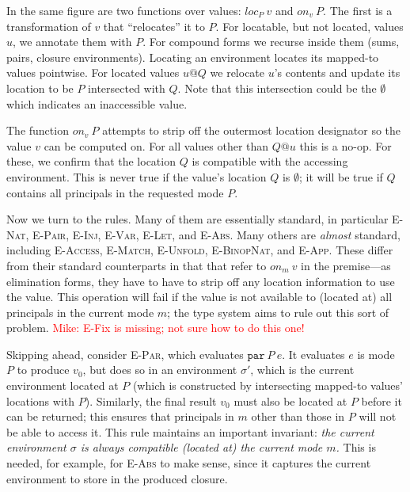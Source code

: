 \documentclass[10pt]{article}
\makeatletter
\newcommand{\rulelab}[1]{{\small \textsc{#1}}}
\newcommand{\kw}[1]{\ensuremath{\mathtt{#1}}}
\newcommand{\epar}[2]{\ensuremath{\kw{par}~{#1}~{#2}}}
\newcommand{\vloc}[2]{\ensuremath{{#1}\kw{@}{#2}}}
\newcommand{\locof}[2]{\ensuremath{\mathit{loc}_{#1}~{#2}}}
\newcommand{\getat}[2]{\ensuremath{\mathit{on}_{#1}~{#2}}}
\newcommand{\mwh}[1]{\textcolor{red}{Mike: #1}}
\makeatother
\begin{document}
In the same figure are two functions over values: $\locof{P}{v}$ and
$\getat{v}{P}$. The first is a transformation of $v$ that
``relocates'' it to $P$. For locatable, but not located, values $u$,
we annotate them with $P$. For compound forms we recurse inside them
(sums, pairs, closure environments). Locating an environment locates
its mapped-to values pointwise.  For located values $\vloc{u}{Q}$ we
relocate $u$'s contents and update its location to be $P$ intersected
with $Q$. Note that this intersection could be the $\emptyset$ which
indicates an inaccessible value.

The function $\getat{v}{P}$ attempts to strip off the outermost
location designator so the value $v$ can be computed on. For all
values other than $\vloc{Q}{u}$ this is a no-op. For these, we confirm
that the location $Q$ is compatible with the accessing
environment. This is never true if the value's location $Q$ is
$\emptyset$; it will be true if $Q$ contains all principals in the
requested mode $P$.

Now we turn to the rules. Many of them are essentially standard, in
particular \rulelab{E-Nat}, \rulelab{E-Pair}, \rulelab{E-Inj},
\rulelab{E-Var}, \rulelab{E-Let}, and \rulelab{E-Abs}. Many others are
\emph{almost} standard, including \rulelab{E-Access},
\rulelab{E-Match}, \rulelab{E-Unfold}, \rulelab{E-BinopNat}, and
\rulelab{E-App}. These differ from their standard counterparts in that
that refer to $\getat{m}{v}$ in the premise---as elimination forms,
they have to have to strip off any location information to use the
value. This operation will fail if the value is not available to
(located at) all principals in the current mode $m$; the type system
aims to rule out this sort of problem.
\mwh{E-Fix is missing; not sure how to do this one!}

Skipping ahead, consider \rulelab{E-Par}, which evaluates
$\epar{P}{e}$. It evaluates $e$ is mode $P$ to produce $v_0$, but does
so in an environment $\sigma'$, which is the current environment
located at $P$ (which is constructed by intersecting mapped-to values'
locations with $P$). Similarly, the final result $v_0$ must also be
located at $P$ before it can be returned; this ensures that principals
in $m$ other than those in $P$ will not be able to access it. This
rule maintains an important invariant: \emph{the current environment $\sigma$ is
always compatible (located at) the current mode $m$.} This is needed,
for example, for \rulelab{E-Abs} to make sense, since it captures the
current environment to store in the produced closure.
\end{document}
